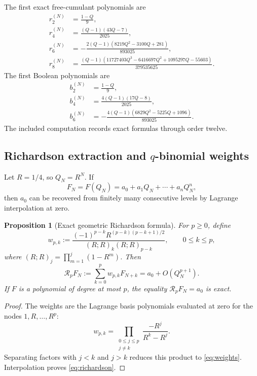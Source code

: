 \documentclass[11pt,oneside]{article}
\newtheorem{proposition}[theorem]{Proposition}
\theoremstyle{definition}
\theoremstyle{remark}
\begin{document}
The first exact free-cumulant polynomials are
\begin{align}
r_2^{(N)}&=\frac{1-Q}{9},\label{eq:finiteR2}\\
r_4^{(N)}&=\frac{(Q-1)(43Q-7)}{2025},\label{eq:finiteR4}\\
r_6^{(N)}&=-\frac{2(Q-1)(8219Q^2-3100Q+281)}{893025},\label{eq:finiteR6}\\
r_8^{(N)}&=\frac{(Q-1)(11727403Q^3-6416697Q^2+1095297Q-55603)}{379535625}.
\label{eq:finiteR8}
\end{align}
The first Boolean polynomials are
\begin{align}
b_2^{(N)}&=\frac{1-Q}{9},\\
b_4^{(N)}&=\frac{4(Q-1)(17Q-8)}{2025},\\
b_6^{(N)}&=-\frac{4(Q-1)(6829Q^2-5225Q+1096)}{893025}.
\end{align}
The included computation records exact formulas through order twelve.

\subsection{Richardson extraction and \texorpdfstring{\(q\)}{q}-binomial weights}
Let \(R=1/4\), so \(Q_N=R^N\). If
\[
F_N=F(Q_N)=a_0+a_1Q_N+\cdots+a_nQ_N^n,
\]
then \(a_0\) can be recovered from finitely many consecutive levels by Lagrange interpolation at zero.

\begin{proposition}[Exact geometric Richardson formula]\label{prop:richardson}
For \(p\ge0\), define
\begin{equation}\label{eq:weights}
w_{p,k}:=
\frac{(-1)^{p-k}R^{(p-k)(p-k+1)/2}}
{(R;R)_k(R;R)_{p-k}},
\qquad 0\le k\le p,
\end{equation}
where \((R;R)_j=\prod_{m=1}^j(1-R^m)\). Then
\begin{equation}\label{eq:richardson}
\mathcal R_pF_N:=\sum_{k=0}^pw_{p,k}F_{N+k}
=a_0+O(Q_N^{p+1}).
\end{equation}
If \(F\) is a polynomial of degree at most \(p\), the equality \(\mathcal R_pF_N=a_0\) is exact.
\end{proposition}
\begin{proof}
The weights are the Lagrange basis polynomials evaluated at zero for the nodes \(1,R,\ldots,R^p\):
\[
w_{p,k}=\prod_{\substack{0\le j\le p\\j\ne k}}\frac{-R^j}{R^k-R^j}.
\]
Separating factors with \(j<k\) and \(j>k\) reduces this product to \eqref{eq:weights}. Interpolation proves \eqref{eq:richardson}.
\end{proof}
\end{document}
